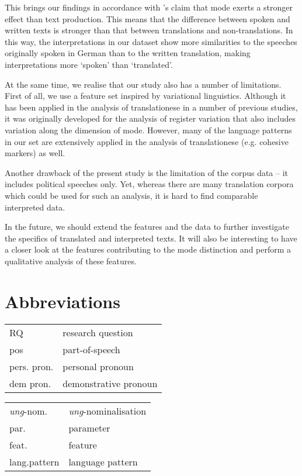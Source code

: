 \documentclass[output=paper,colorlinks,citecolor=brown]{langscibook}
\begin{document}
This brings our findings in accordance with \citet{ShlesingerOrdan2012}'s claim that mode exerts a stronger effect than text production. This means that the difference between spoken and written texts %
is stronger than that between translations and non-translations. In this way, the interpretations in our dataset show more similarities to the speeches originally spoken in German than to the written translation, making interpretations more `spoken' than `translated'. 

At the same time, we realise that our study also has a number of limitations. First of all, we use a feature set inspired by variational linguistics. Although it has been applied in the analysis of translationese in a number of previous studies, it was originally developed for the analysis of register variation that also includes variation along the dimension of mode. However, many of the language patterns in our set are extensively applied in the analysis of translationese (e.g. cohesive markers) as well. 

Another drawback of the present study is the limitation of the corpus data -- it includes political speeches only. Yet, whereas there are many translation corpora which could be used for such an analysis, it is hard to find comparable interpreted data.

In the future, we should extend the features and the data to further investigate the specifics of translated and interpreted texts. It will also be interesting to have a closer look at the features contributing to the mode distinction and perform a qualitative analysis of these features.

\section*{Abbreviations}
\begin{tabularx}{.54\textwidth}{lQ}
RQ & research question\\
pos & part-of-speech\\
pers. pron. & personal pronoun\\
dem pron. & demonstrative pronoun\\
\end{tabularx}%
\begin{tabularx}{.45\textwidth}{ll}
\emph{ung}-nom. & \emph{ung}-nominalisation\\
par. & parameter\\
feat. & feature\\
lang.pattern & language pattern\\
\end{tabularx}

\sloppy

\printbibliography[heading=subbibliography,notkeyword=this]
\end{document}
